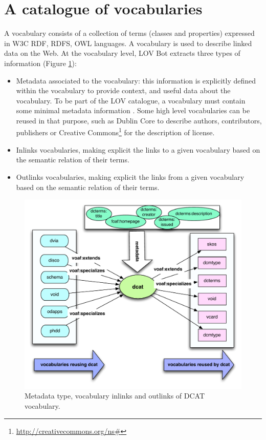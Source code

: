 \documentclass{iosart2c}
\begin{document}
\section{A catalogue of vocabularies}
\label{sec:metadata}
A vocabulary consists of a collection of terms (classes and properties) expressed in W3C RDF, RDFS, OWL languages. A vocabulary is used to describe linked data on the Web. At the vocabulary level, LOV Bot extracts three types of information (Figure \ref{fig:dcat}):
\begin{itemize}
\item Metadata associated to the vocabulary: this information is explicitly defined within the vocabulary to provide context, and useful data about the vocabulary. To be part of the LOV catalogue, a vocabulary must contain some minimal metadata information \cite{vandenbussche2011metadata}. Some high level vocabularies can be reused in that purpose, such as Dublin Core to describe authors, contributors, publishers or Creative Commons\footnote{\url{http://creativecommons.org/ns#}} for the description of license.

\item Inlinks vocabularies, making explicit the links to a given vocabulary based on the semantic relation of their terms.

\item Outlinks vocabularies, making explicit the links from a given vocabulary based on the semantic relation of their terms.
\end{itemize}

\begin{figure}[ht!b]
\includegraphics[scale=0.4]{dcat-relations.pdf}
\caption{Metadata type, vocabulary inlinks and outlinks of DCAT vocabulary.}
\label{fig:dcat}
\end{figure}
\end{document}
